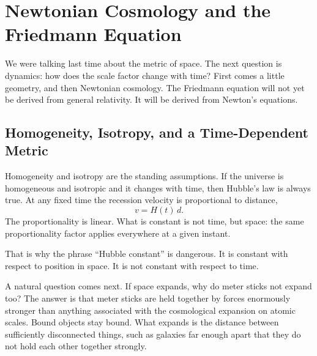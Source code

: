 \chapter{Newtonian Cosmology and the Friedmann Equation}

We were talking last time about the metric of space. The next question is dynamics: how does the scale factor change with time? First comes a little geometry, and then Newtonian cosmology. The Friedmann equation will not yet be derived from general relativity. It will be derived from Newton's equations.

\section{Homogeneity, Isotropy, and a Time-Dependent Metric}

Homogeneity and isotropy are the standing assumptions. If the universe is homogeneous and isotropic and it changes with time, then Hubble's law is always true. At any fixed time the recession velocity is proportional to distance,
\begin{equation}
v = H(t)\,d.
\end{equation}
The proportionality is linear. What is constant is not time, but space: the same proportionality factor applies everywhere at a given instant.

\begin{classroomqa}
\end{classroomqa}

That is why the phrase ``Hubble constant'' is dangerous. It is constant with respect to position in space. It is not constant with respect to time.

A natural question comes next. If space expands, why do meter sticks not expand too? The answer is that meter sticks are held together by forces enormously stronger than anything associated with the cosmological expansion on atomic scales. Bound objects stay bound. What expands is the distance between sufficiently disconnected things, such as galaxies far enough apart that they do not hold each other together strongly.

\begin{classroomqa}
\end{classroomqa}

